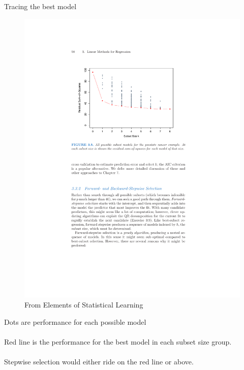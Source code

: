 \documentclass[mathserif, aspectratio=169]{beamer}
\begin{document}
\begin{frame}{Tracing the best model}


\begin{figure}
\includegraphics[scale=0.6]{subset_surfing}
\caption*{\tiny From Elements of Statistical Learning}
\end{figure}

Dots are performance for each possible model\\~\\

Red line is the performance for the best model in each subset size group.\\~\\

Stepwise selection would either ride on the red line or above.  
\end{frame}
\end{document}

